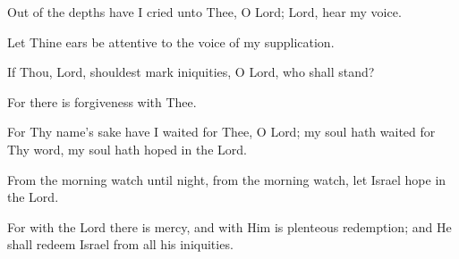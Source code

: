 Out of the depths have I cried unto Thee, O Lord; Lord, hear my voice.

Let Thine ears be attentive to the voice of my supplication.

If Thou, Lord, shouldest mark iniquities, O Lord, who shall stand?

For there is forgiveness with Thee.

For Thy name's sake have I waited for Thee, O Lord; my soul hath waited for Thy word, my soul hath hoped in the Lord.

From the morning watch until night, from the morning watch, let Israel hope in the Lord.

For with the Lord there is mercy, and with Him is plenteous redemption; and He shall redeem Israel from all his iniquities.
